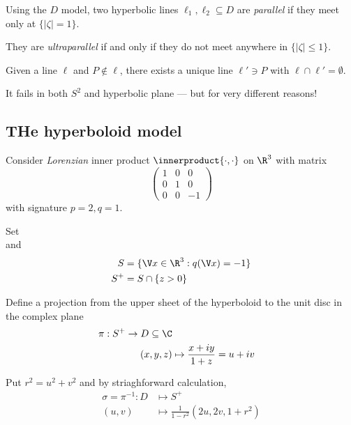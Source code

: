 \documentclass[a4paper]{article}
\theoremstyle{definition}
\newcommand*{\inner}{\innerproduct}
\begin{document}
\begin{definition}
  Using the \(D\) model, two hyperbolic lines \(\ell_1, \ell_2 \subseteq D\) are \emph{parallel} if they meet only at \(\{|\zeta| = 1\}\).

  They are \emph{ultraparallel} if and only if they do not meet anywhere in \(\{|\zeta| \leq 1\}\).
\end{definition}

\begin{axiom}
  Given a line \(\ell\) and \(P \notin \ell\), there exists a unique line \(\ell' \ni P\) with \(\ell \cap \ell' = \emptyset\).
\end{axiom}

It fails in both \(S^2\) and hyperbolic plane --- but for very different reasons!

\subsection{THe hyperboloid model}

Consider \emph{Lorenzian} inner product \(\inner{\cdot, \cdot}\) on \(\R^3\) with matrix
\[
  \begin{pmatrix}
    1 & 0 & 0 \\
    0 & 1 & 0 \\
    0 & 0 & -1
  \end{pmatrix}
\]
with signature \(p = 2, q = 1\).

Set
\[
\]
and
\begin{align*}
  S &= \{\V x \in \R^3: q(\V x) = -1\} \\
  S^+ &= S \cap \{z > 0\}
\end{align*}

Define a projection from the upper sheet of the hyperboloid to the unit disc in the complex plane
\begin{align*}
  \pi: S^+ \to D \subseteq \C \\
  (x, y, z) &\mapsto \frac{x + iy}{1 + z} = u + iv
\end{align*}

Put \(r^2 = u^2 + v^2\) and by striaghforward calculation,
\begin{align*}
  \sigma = \pi^{-1}: D &\mapsto S^+ \\
  (u, v) &\mapsto \frac{1}{1 - r^2} (2u, 2v, 1 + r^2) 
\end{align*}
\end{document}
